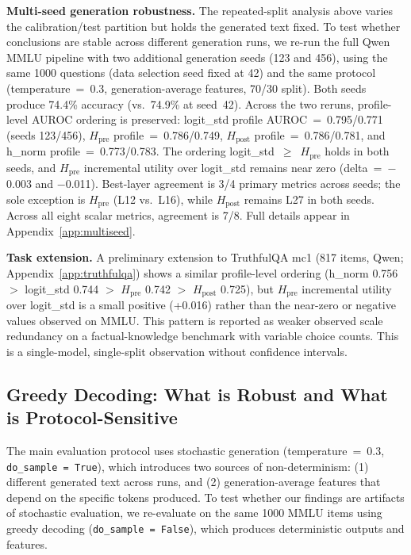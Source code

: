 \documentclass{ieeeaccess}
\newcommand{\Hpre}{H_{\text{pre}}}
\newcommand{\Hpost}{H_{\text{post}}}
\begin{document}
\textbf{Multi-seed generation robustness.} The repeated-split analysis above varies the calibration/test partition but holds the generated text fixed. To test whether conclusions are stable across different generation runs, we re-run the full Qwen MMLU pipeline with two additional generation seeds (123 and 456), using the same 1000 questions (data selection seed fixed at 42) and the same protocol (temperature~=~0.3, generation-average features, 70/30 split). Both seeds produce 74.4\% accuracy (vs.\ 74.9\% at seed~42). Across the two reruns, profile-level AUROC ordering is preserved: logit\_std profile AUROC~=~0.795/0.771 (seeds 123/456), $\Hpre$ profile~=~0.786/0.749, $\Hpost$ profile~=~0.786/0.781, and h\_norm profile~=~0.773/0.783. The ordering logit\_std~$\geq$~$\Hpre$ holds in both seeds, and $\Hpre$ incremental utility over logit\_std remains near zero (delta~=~$-$0.003 and $-$0.011). Best-layer agreement is 3/4 primary metrics across seeds; the sole exception is $\Hpre$ (L12 vs.\ L16), while $\Hpost$ remains L27 in both seeds. Across all eight scalar metrics, agreement is 7/8. Full details appear in Appendix~\ref{app:multiseed}.

\textbf{Task extension.} A preliminary extension to TruthfulQA mc1 \cite{lin2022truthfulqa} (817 items, Qwen; Appendix~\ref{app:truthfulqa}) shows a similar profile-level ordering (h\_norm 0.756 $>$ logit\_std 0.744 $>$ $\Hpre$ 0.742 $>$ $\Hpost$ 0.725), but $\Hpre$ incremental utility over logit\_std is a small positive (+0.016) rather than the near-zero or negative values observed on MMLU. This pattern is reported as weaker observed scale redundancy on a factual-knowledge benchmark with variable choice counts. This is a single-model, single-split observation without confidence intervals.

\FloatBarrier
\subsection{Greedy Decoding: What is Robust and What is Protocol-Sensitive}
\label{sec:greedy}

The main evaluation protocol uses stochastic generation (temperature~=~0.3, \texttt{do\_sample~=~True}), which introduces two sources of non-determinism: (1) different generated text across runs, and (2) generation-average features that depend on the specific tokens produced. To test whether our findings are artifacts of stochastic evaluation, we re-evaluate on the same 1000 MMLU items using greedy decoding (\texttt{do\_sample~=~False}), which produces deterministic outputs and features.
\end{document}
